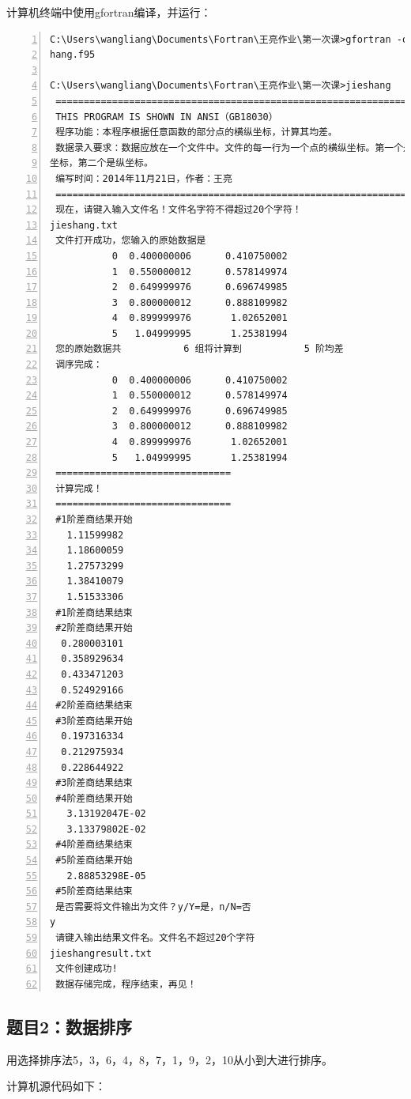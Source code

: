 \documentclass[hyperref,UTF-8]{ctexart}
\begin{document}
计算机终端中使用gfortran编译，并运行：

\begin{Verbatim}[numbers=left,fontsize=\small]
C:\Users\wangliang\Documents\Fortran\王亮作业\第一次课>gfortran -o jieshang jies
hang.f95

C:\Users\wangliang\Documents\Fortran\王亮作业\第一次课>jieshang
 ===================================================================
 THIS PROGRAM IS SHOWN IN ANSI（GB18030）
 程序功能：本程序根据任意函数的部分点的横纵坐标，计算其均差。
 数据录入要求：数据应放在一个文件中。文件的每一行为一个点的横纵坐标。第一个是横
坐标，第二个是纵坐标。
 编写时间：2014年11月21日，作者：王亮
 ===================================================================
 现在，请键入输入文件名！文件名字符不得超过20个字符！
jieshang.txt
 文件打开成功，您输入的原始数据是
           0  0.400000006      0.410750002
           1  0.550000012      0.578149974
           2  0.649999976      0.696749985
           3  0.800000012      0.888109982
           4  0.899999976       1.02652001
           5   1.04999995       1.25381994
 您的原始数据共           6 组将计算到           5 阶均差
 调序完成：
           0  0.400000006      0.410750002
           1  0.550000012      0.578149974
           2  0.649999976      0.696749985
           3  0.800000012      0.888109982
           4  0.899999976       1.02652001
           5   1.04999995       1.25381994
 ===============================
 计算完成！
 ===============================
 #1阶差商结果开始
   1.11599982
   1.18600059
   1.27573299
   1.38410079
   1.51533306
 #1阶差商结果结束
 #2阶差商结果开始
  0.280003101
  0.358929634
  0.433471203
  0.524929166
 #2阶差商结果结束
 #3阶差商结果开始
  0.197316334
  0.212975934
  0.228644922
 #3阶差商结果结束
 #4阶差商结果开始
   3.13192047E-02
   3.13379802E-02
 #4阶差商结果结束
 #5阶差商结果开始
   2.88853298E-05
 #5阶差商结果结束
 是否需要将文件输出为文件？y/Y=是，n/N=否
y
 请键入输出结果文件名。文件名不超过20个字符
jieshangresult.txt
 文件创建成功!
 数据存储完成，程序结束，再见！
\end{Verbatim}
\subsection{题目2：数据排序}
用选择排序法5，3，6，4，8，7，1，9，2，10从小到大进行排序。

计算机源代码如下：
\end{document}
